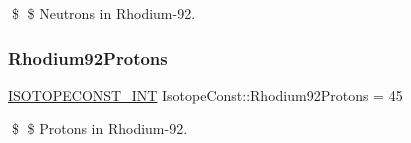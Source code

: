 \$ \$ Neutrons in Rhodium-\/92. \mbox{\label{group___isotope_const-_rhodium-_rh92_ga570942b2ecc6a8ce3499cf2386780847}} 
\subsubsection{\texorpdfstring{Rhodium92\+Protons}{Rhodium92Protons}}
{\footnotesize\ttfamily \mbox{\hyperlink{group___isotope_const-_macros_ga5f18360b3e99483a35c32d789e62621c}{I\+S\+O\+T\+O\+P\+E\+C\+O\+N\+S\+T\+\_\+\+I\+NT}} Isotope\+Const\+::\+Rhodium92\+Protons = 45}

\$ \$ Protons in Rhodium-\/92. 